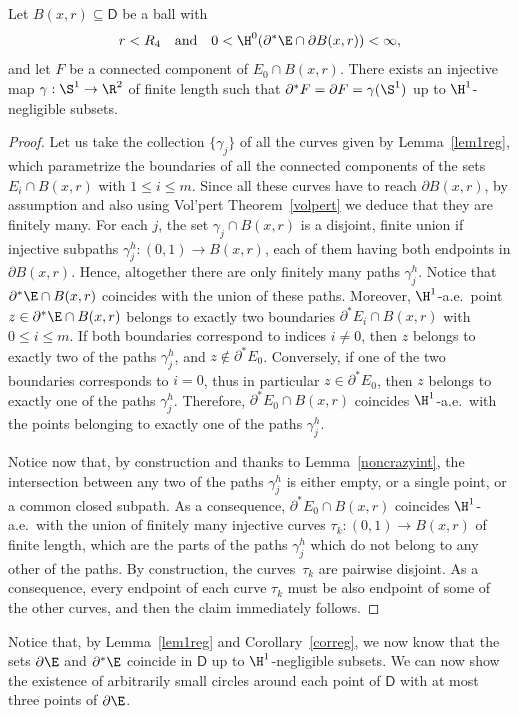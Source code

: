 \begin{cor}\label{correg}
Let $B(x,r)\subseteq \mathsf{D}$ be a ball with
\[
r<R_4\quad\text{and}\quad0<\H^0(\partial^*\E\cap\partial B(x,r))<\infty,
\]
and let $F$ be a connected component of $E_0\cap B(x,r)$. There exists an injective map $\gamma:\S^1\to\R^2$ of finite length such that $\partial^* F=\partial F=\gamma(\S^1)$ up to $\H^1$-negligible subsets.
\end{cor}
\begin{proof}
Let us take the collection $\{\gamma_j\}$ of all the curves given by Lemma~\ref{lem1reg}, which parametrize the boundaries of all the connected components of the sets $E_i\cap B(x,r)$ with $1\leq i \leq m$. Since all these curves have to reach $\partial B(x,r)$, by assumption and also using Vol'pert Theorem~\ref{volpert} we deduce that they are finitely many. For each $j$, the set $\gamma_j\cap B(x,r)$ is a disjoint, finite union if injective subpaths $\gamma_j^h:(0,1)\to B(x,r)$, each of them having both endpoints in $\partial B(x,r)$. Hence, altogether there are only finitely many paths $\gamma_j^h$. Notice that $\partial^*\E\cap B(x,r)$ coincides with the union of these paths. Moreover, $\H^1$-a.e.\ point $z\in\partial^*\E\cap B(x,r)$ belongs to exactly two boundaries $\partial^* E_i \cap B(x,r)$ with $0\leq i \leq m$. If both boundaries correspond to indices $i\neq 0$, then $z$ belongs to exactly two of the paths $\gamma_j^h$, and $z\notin \partial^* E_0$. Conversely, if one of the two boundaries corresponds to $i=0$, thus in particular $z\in \partial^* E_0$, then $z$ belongs to exactly one of the paths $\gamma_j^h$. Therefore, $\partial^* E_0\cap B(x,r)$ coincides $\H^1$-a.e.\ with the points belonging to exactly one of the paths $\gamma_j^h$.

Notice now that, by construction and thanks to Lemma~\ref{noncrazyint}, the intersection between any two of the paths $\gamma_j^h$ is either empty, or a single point, or a common closed subpath. As a consequence, $\partial^* E_0\cap B(x,r)$ coincides $\H^1$-a.e.\ with the union of finitely many injective curves $\tau_k:(0,1)\to B(x,r)$ of finite length, which are the parts of the paths $\gamma_j^h$ which do not belong to any other of the paths. By construction, the curves~$\tau_k$ are pairwise disjoint. As a consequence, every endpoint of each curve $\tau_k$ must be also endpoint of some of the other curves, and then the claim immediately follows.
\end{proof}

Notice that, by Lemma~\ref{lem1reg} and Corollary~\ref{correg}, we now know that the sets $\partial\E$ and $\partial^*\E$ coincide in $\mathsf{D}$ up to $\H^1$-negligible subsets. We can now show the existence of arbitrarily small circles around each point of $\mathsf{D}$ with at most three points of $\partial\E$.

